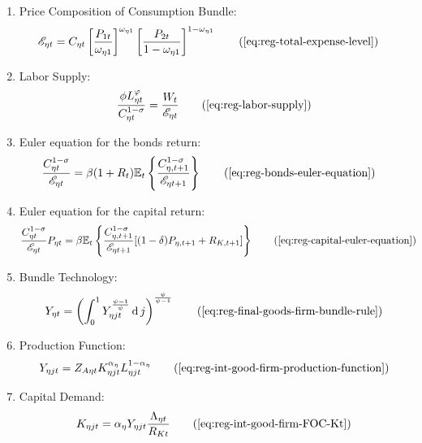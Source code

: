 \documentclass[../thesis.tex]{subfiles}
\begin{document}
{\begin{itemize}
\begin{enumerate}
\begin{tcolorbox}[colback=red!5!white,colframe=red!75!black]
\begin{comment}
		\end{comment}
				
		\end{tcolorbox}

		\item Price Composition of Consumption Bundle:
		\begin{align}
			\te &= C_{\eta t} \left[ \frac{P_{1 t}}{\omega_{\eta 1}} \right]^{\omega_{\eta 1}} \left[ \frac{P_{2 t}}{1 -\omega_{\eta 1}} \right]^{1 -\omega_{\eta 1}} \tag{\ref{eq:reg-total-expense-level}}
		\end{align}

		\item Labor Supply:
		\begin{align}
			\frac{\phi L_{\eta t}^{\varphi}}{C_{\eta t}^{1-\sigma}} = \frac{W_t}{\te} \tag{\ref{eq:reg-labor-supply}}
		\end{align}

		\item Euler equation for the bonds return:
		\begin{align}
			\frac{ C_{\eta t}^{1-\sigma}}{ \te} &= \beta (1 + R_{t}) \E \left\{ \frac{ C_{\eta, t+1}^{1-\sigma}}{ \te[t+1]} \right\} \tag{\ref{eq:reg-bonds-euler-equation}}
		\end{align}
		
		\item Euler equation for the capital return:
		\begin{align}
			\frac{ C_{\eta t}^{1-\sigma}}{ \te} P_{\eta t} &= \beta \mathbb{E}_t \left\{ \frac{ C_{\eta, t+1}^{1-\sigma}}{ \te[t+1]} [(1-\delta) P_{\eta, t+1} + R_{K,t+1}] \right\} \tag{\ref{eq:reg-capital-euler-equation}}
		\end{align}
					
		\item Bundle Technology:
		\begin{align}
			Y_{\eta t} = \left( \int_{0}^{1} Y_{\eta jt}^{\frac{\psi-1}{\psi}} \dif j \right)^{\frac{\psi}{\psi-1}} \tag{\ref{eq:reg-final-goods-firm-bundle-rule}}
		\end{align}
		
		\item Production Function:
		\begin{align}
			Y_{\eta jt} = Z_{A\eta t} K_{\eta jt}^{\alpha_{\eta}} L_{\eta jt}^{1-{\alpha_{\eta}}} \tag{\ref{eq:reg-int-good-firm-production-function}}
		\end{align}
		
		\item Capital Demand:
		\begin{align}
			K_{\eta jt} = {\alpha_{\eta}} Y_{\eta jt} \frac{\Lambda_{\eta t}}{R_{Kt}} \tag{\ref{eq:reg-int-good-firm-FOC-Kt}}
		\end{align}
		

\end{enumerate}
\end{itemize}}
\end{document}
